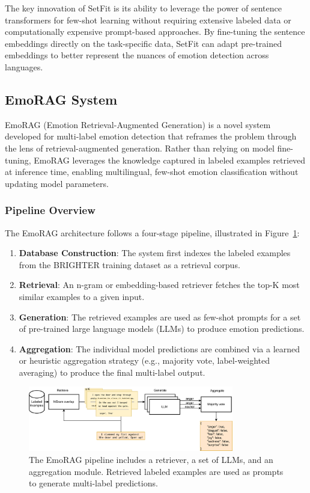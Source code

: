 \documentclass[a4paper,12pt]{extarticle}
\begin{document}
The key innovation of SetFit is its ability to leverage the power of sentence transformers for few-shot learning without requiring extensive labeled data or computationally expensive prompt-based approaches. By fine-tuning the sentence embeddings directly on the task-specific data, SetFit can adapt pre-trained embeddings to better represent the nuances of emotion detection across languages.

\subsection{EmoRAG System}

EmoRAG (Emotion Retrieval-Augmented Generation) is a novel system developed for multi-label emotion detection that reframes the problem through the lens of retrieval-augmented generation. Rather than relying on model fine-tuning, EmoRAG leverages the knowledge captured in labeled examples retrieved at inference time, enabling multilingual, few-shot emotion classification without updating model parameters.

\subsubsection{Pipeline Overview}

The EmoRAG architecture follows a four-stage pipeline, illustrated in Figure~\ref{fig:emorag_pipeline}:

\begin{enumerate}
\item \textbf{Database Construction}: The system first indexes the labeled examples from the BRIGHTER training dataset as a retrieval corpus.
\item \textbf{Retrieval}: An n-gram or embedding-based retriever fetches the top-K most similar examples to a given input.
\item \textbf{Generation}: The retrieved examples are used as few-shot prompts for a set of pre-trained large language models (LLMs) to produce emotion predictions.
\item \textbf{Aggregation}: The individual model predictions are combined via a learned or heuristic aggregation strategy (e.g., majority vote, label-weighted averaging) to produce the final multi-label output.
\end{enumerate}


\begin{figure}[h]
    \centering
    \includegraphics[width=0.8\textwidth]{emorag.png}
    \caption{The EmoRAG pipeline includes a retriever, a set of LLMs, and an aggregation module. Retrieved labeled examples are used as prompts to generate multi-label predictions.}
    \label{fig:emorag_pipeline}
\end{figure}
\end{document}
